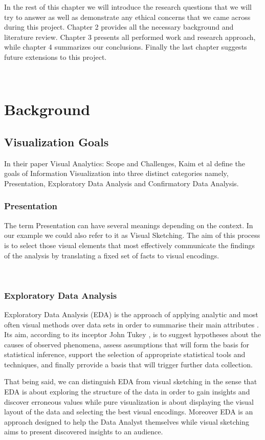 \documentclass[16pt]{extreport}
\begin{document}
\parbox{\linewidth}{
	\justify
	\large{In the rest of this chapter we will introduce the research questions that we will try to answer as well as demonstrate any ethical concerns that we came across during this project. Chapter 2 provides all the necessary background and literature review. Chapter 3 presents all performed work and research approach, while chapter 4 summarizes our conclusions. Finally the last chapter suggests future extensions to this project.}}
\hfill \break\\

\chapter{Background}

\section{Visualization Goals}

\parbox{\linewidth}{
	\justify
	\large{
	In their paper Visual Analytics: Scope and Challenges, Kaim et al \cite{kaim} define the goals of Information Visualization into three distinct categories namely, Presentation, Exploratory Data Analysis and 		Confirmatory Data Analysis.}
}

\subsection{Presentation} 
\parbox{\linewidth}{
\justify
\large{
The term Presentation can have several meanings depending on the context. In our example we could also refer to it as Visual Sketching. The aim of this process is to select those visual elements that most effectively communicate the findings of the analysis by translating a fixed set of facts to visual encodings.}}
\hfill \break\\
\subsection{Exploratory Data Analysis}

\large{Exploratory Data Analysis (EDA) is the approach of applying analytic and most often visual methods over data sets in order to summarise their main attributes \cite{eda1}. Its aim, according to its inceptor John Tukey \cite{eda2}, is to suggest hypotheses about the causes of observed phenomena, assess assumptions that will form the basis for statistical inference, support the selection of appropriate statistical tools and techniques, and finally prrovide a basis that will trigger further data collection.}
\hfill \break\\
\parbox{\linewidth}{
\justify
\large{That being said, we can distinguish EDA from visual sketching in the sense that EDA is about exploring the structure of the data in order to gain insights and discover erroneous values while pure visualization is about displaying the visual layout of the data and selecting the best visual encodings. Moreover EDA is an approach designed to help the Data Analyst themselves while visual sketching aims to present discovered insights to an audience.}}
\hfill \break\\
\end{document}
